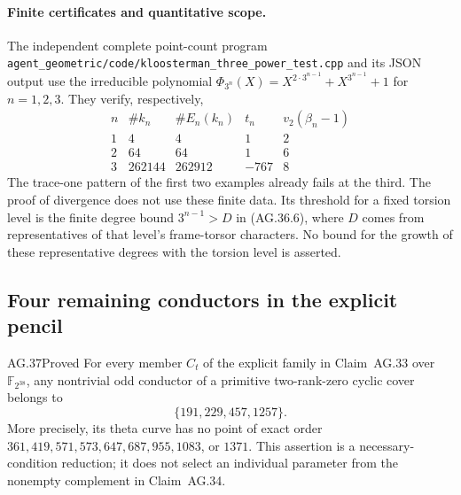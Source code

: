 \paragraph{Finite certificates and quantitative scope.}
The independent complete point-count program
\texttt{agent\_geometric/code/kloosterman\_three\_power\_test.cpp}
and its JSON output use the irreducible polynomial
\(\Phi_{3^n}(X)=X^{2\cdot3^{n-1}}+X^{3^{n-1}}+1\)
for \(n=1,2,3\). They verify, respectively,
\[
\begin{array}{c|r|r|r|r}
 n&\#k_n&\#E_n(k_n)&t_n&v_2(\beta_n-1)\\\hline
 1&4&4&1&2\\
 2&64&64&1&6\\
 3&262144&262912&-767&8
\end{array}
\]
The trace-one pattern of the first two examples already
fails at the third. The proof of divergence does not use
these finite data. Its threshold for a fixed torsion level
is the finite degree bound \(3^{n-1}>D\) in (AG.36.6),
where \(D\) comes from representatives of that level's
frame-torsor characters. No bound for the growth of these
representative degrees with the torsion level is asserted.

\subsection{Four remaining conductors in the explicit pencil}

\begin{claim}{AG.37}{Proved}\label{clm:AGsidonfour}
For every member \(C_t\) of the explicit family in
Claim~AG.33 over
\(\mathbb F_{2^{38}}\), any nontrivial odd conductor of a
primitive two-rank-zero cyclic cover belongs to
\[
                         \{191,229,457,1257\}.
                                                        \tag{AG.37.1}
\]
More precisely, its theta curve has no point of exact order
\(361,419,571,573,647,687,955,1083\), or \(1371\).
This assertion is a necessary-condition reduction; it does not select
an individual parameter from the nonempty complement in Claim~AG.34.
\end{claim}

